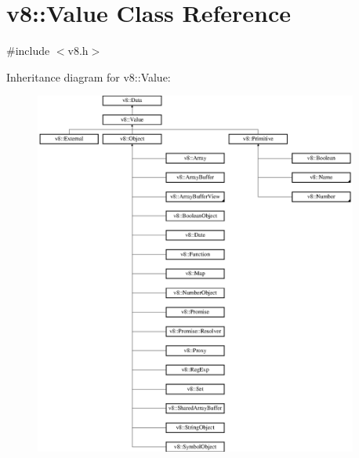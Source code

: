 \hypertarget{classv8_1_1_value}{}\section{v8\+:\+:Value Class Reference}
\label{classv8_1_1_value}


{\ttfamily \#include $<$v8.\+h$>$}

Inheritance diagram for v8\+:\+:Value\+:\begin{figure}[H]
\begin{center}
\leavevmode
\includegraphics[height=12.000000cm]{classv8_1_1_value}
\end{center}
\end{figure}
